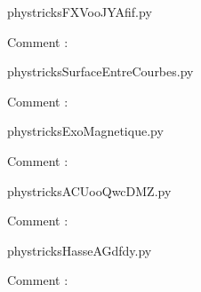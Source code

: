     \clearpage
    


    \newcommand{\CaptionFigFXVooJYAfif}{<+Type your caption here+>}
    \begin{center}
        
    \end{center}
    phystricksFXVooJYAfif.py

    Comment : 

    \clearpage
    


    \newcommand{\CaptionFigSurfaceEntreCourbes}{<+Type your caption here+>}
    \begin{center}
        
    \end{center}
    phystricksSurfaceEntreCourbes.py

    Comment : 

    \clearpage
    


    \newcommand{\CaptionFigExoMagnetique}{<+Type your caption here+>}
    \begin{center}
        
    \end{center}
    phystricksExoMagnetique.py

    Comment : 

    \clearpage
    


    \newcommand{\CaptionFigACUooQwcDMZ}{<+Type your caption here+>}
    \begin{center}
        
    \end{center}
    phystricksACUooQwcDMZ.py

    Comment : 

    \clearpage
    


    \newcommand{\CaptionFigHasseAGdfdy}{<+Type your caption here+>}
    \begin{center}
        
    \end{center}
    phystricksHasseAGdfdy.py

    Comment : 

    \clearpage
    

